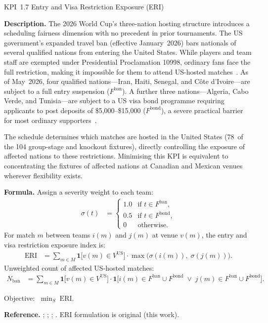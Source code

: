 \documentclass[12pt, letterpaper]{article}
\newcommand{\kpilabel}[1]{\noindent\textbf{#1}\enspace}
\begin{document}
\begin{kpibox}{KPI~1.7 \textendash{} Entry and Visa Restriction Exposure (ERI)}

\kpilabel{Description.}
The 2026 World Cup's three-nation hosting structure introduces a
scheduling fairness dimension with no precedent in prior tournaments.
The US government's expanded travel ban (effective January~2026) bars
nationals of several qualified nations from entering the United States.
While players and team staff are exempted under Presidential Proclamation
10998, ordinary fans face the full restriction, making it impossible for
them to attend US-hosted matches~\citep{ESPN2026TravelBan,
NPR2026TravelBan}.  As of May~2026, four qualified nations---Iran,
Haiti, Senegal, and C\^{o}te d'Ivoire---are subject to a full entry
suspension ($F^{\mathrm{ban}}$).  A further three nations---Algeria,
Cabo Verde, and Tunisia---are subject to a US visa bond programme
requiring applicants to post deposits of \$5{,}000--\$15{,}000
($F^{\mathrm{bond}}$), a severe practical barrier for most ordinary
supporters~\citep{AIC2026TravelBan}.

The schedule determines which matches are hosted in the United States
(78~of the 104 group-stage and knockout fixtures), directly controlling
the exposure of affected nations to these restrictions.  Minimising this
KPI is equivalent to concentrating the fixtures of affected nations at
Canadian and Mexican venues wherever flexibility exists.

\medskip
\kpilabel{Formula.}
Assign a severity weight to each team:
\begin{align*}
  \sigma(t) &= \begin{cases}
    1.0 & \text{if } t \in F^{\mathrm{ban}}, \\
    0.5 & \text{if } t \in F^{\mathrm{bond}}, \\
    0   & \text{otherwise.}
  \end{cases}
\end{align*}
For match $m$ between teams $i(m)$ and $j(m)$ at venue $v(m)$, the
entry and visa restriction exposure index is:
\begin{align*}
  \mathrm{ERI} &= \sum_{m \in M}
    \mathbf{1}\!\bigl[v(m) \in V^{\mathrm{US}}\bigr]\cdot
    \max\!\bigl(\sigma(i(m)),\;\sigma(j(m))\bigr).
\end{align*}
Unweighted count of affected US-hosted matches:
\begin{align*}
  N_{\mathrm{ban}} &= \sum_{m \in M}
    \mathbf{1}\!\bigl[v(m) \in V^{\mathrm{US}}\bigr]\cdot
    \mathbf{1}\!\bigl[i(m) \in F^{\mathrm{ban}} \cup F^{\mathrm{bond}}
    \;\vee\; j(m) \in F^{\mathrm{ban}} \cup F^{\mathrm{bond}}\bigr].
\end{align*}
\vspace{-8pt}

\noindent
Objective: $\;\displaystyle\min_{S}\;\mathrm{ERI}$.

\medskip
\kpilabel{Reference.}
\citet{ESPN2026TravelBan}; \citet{NPR2026TravelBan};
\citet{AIC2026TravelBan}; \citet{FIFA2023Format}.
ERI formulation is original (this work).
\end{kpibox}
\end{document}
